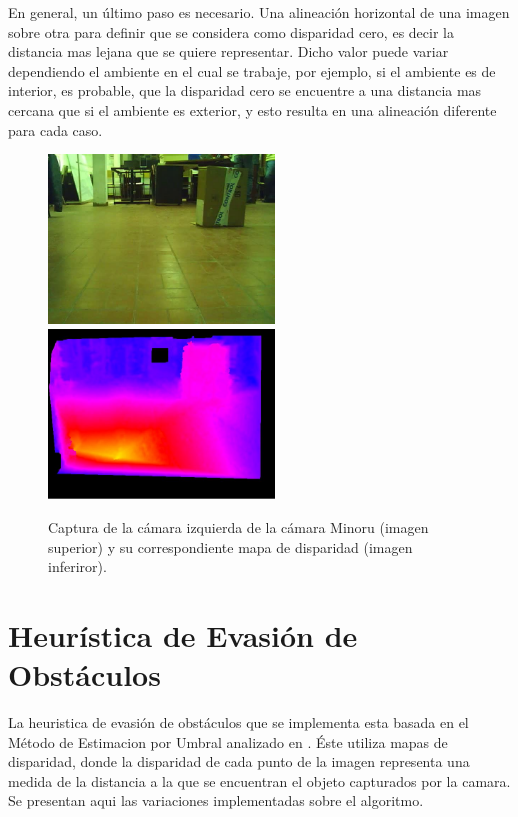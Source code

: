 \documentclass[journal]{IEEEtran}
\begin{document}
En general, un \'ultimo paso es necesario. Una alineaci\'on horizontal de una imagen sobre otra para definir que se considera como disparidad cero, es decir la distancia mas lejana que se quiere representar. Dicho valor puede variar dependiendo el ambiente en el cual se trabaje, por ejemplo, si el ambiente es de interior, es probable, que la disparidad cero se encuentre a una distancia mas cercana que si el ambiente es exterior, y esto resulta en una alineaci\'on diferente para cada caso.


\begin{figure}[ht]
	\begin{center}
		\includegraphics[width=6cm]{./images/original.jpg}
		\includegraphics[width=6cm]{./images/disparidad.jpg}
		\caption{Captura de la c\'amara izquierda de la c\'amara Minoru (imagen superior) y su correspondiente mapa de disparidad (imagen inferiror).}
	\end{center}
\end{figure}

\section{Heur\'istica de Evasi\'on de Obst\'aculos}
\label{sec:heuristica}

La heuristica de evasi\'on de obst\'aculos que se implementa esta basada en el M\'etodo de Estimacion por Umbral analizado en \cite{KNG10}. \'Este utiliza mapas de disparidad, donde la disparidad de cada punto de la imagen representa una medida de la distancia a la que se encuentran el objeto capturados por la camara. Se presentan aqui las variaciones implementadas sobre el algoritmo.
\end{document}
